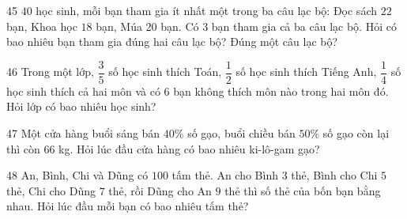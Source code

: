 \gap
\begin{probbox}{45}{}
$40$ học sinh, mỗi bạn tham gia ít nhất một trong ba câu lạc bộ: Đọc sách $22$ bạn, Khoa học $18$ bạn, Múa $20$ bạn. Có $3$ bạn tham gia cả ba câu lạc bộ. Hỏi có bao nhiêu bạn tham gia đúng hai câu lạc bộ? Đúng một câu lạc bộ?
\end{probbox}
\gap
\begin{probbox}{46}{}
Trong một lớp, $\dfrac35$ số học sinh thích Toán, $\dfrac12$ số học sinh thích Tiếng Anh, $\dfrac14$ số học sinh thích cả hai môn và có $6$ bạn không thích môn nào trong hai môn đó. Hỏi lớp có bao nhiêu học sinh?
\end{probbox}
\gap
\begin{probbox}{47}{}
Một cửa hàng buổi sáng bán $40\%$ số gạo, buổi chiều bán $50\%$ số gạo còn lại thì còn $66$ kg. Hỏi lúc đầu cửa hàng có bao nhiêu ki-lô-gam gạo?
\end{probbox}
\gap
\begin{probbox}{48}{}
An, Bình, Chi và Dũng có $100$ tấm thẻ. An cho Bình $3$ thẻ, Bình cho Chi $5$ thẻ, Chi cho Dũng $7$ thẻ, rồi Dũng cho An $9$ thẻ thì số thẻ của bốn bạn bằng nhau. Hỏi lúc đầu mỗi bạn có bao nhiêu tấm thẻ?
\end{probbox}
